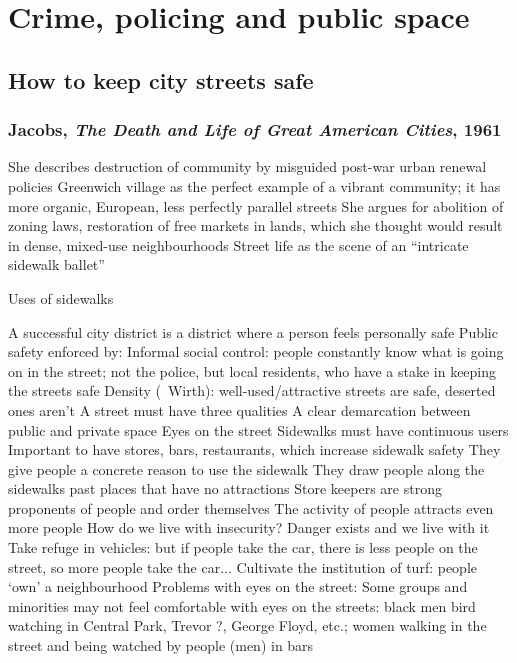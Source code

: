 \documentclass{article}
\begin{document}

\section{Crime, policing and public space}
\date{September 28th, 2021}

\subsection{How to keep city streets safe}

\subsubsection{Jacobs, \textit{The Death and Life of Great American Cities}, 1961}

\begin{outline}
	\1 She describes destruction of community by misguided post-war urban renewal policies
	\1 Greenwich village as the perfect example of a vibrant community; it has more organic, European, less perfectly parallel streets
	\1 She argues for abolition of zoning laws, restoration of free markets in lands, which she thought would result in dense, mixed-use neighbourhoods
	\1 Street life as the scene of an ``intricate sidewalk ballet''
\end{outline}

Uses of sidewalks
\begin{outline}
		\1 A successful city district is a district where a person feels personally safe
		\1 Public safety enforced by:
			\2 Informal social control: people constantly know what is going on in the street; not the police, but local residents, who have a stake in keeping the streets safe
			\2 Density (~Wirth): well-used/attractive streets are safe, deserted ones aren't
		\1 A street must have three qualities
			\2 A clear demarcation between public and private space
			\2 Eyes on the street
			\2 Sidewalks must have continuous users
		\1 Important to have stores, bars, restaurants, which increase sidewalk safety
			\2 They give people a concrete reason to use the sidewalk
			\2 They draw people along the sidewalks past places that have no attractions
			\2 Store keepers are strong proponents of people and order themselves
			\2 The activity of people attracts even more people
		\1 How do we live with insecurity?
			\2 Danger exists and we live with it
			\2 Take refuge in vehicles: but if people take the car, there is less people on the street, so more people take the car...
			\2 Cultivate the institution of turf: people `own' a neighbourhood
		\1 Problems with eyes on the street:
			\2 Some groups and minorities may not feel comfortable with eyes on the streets: black men bird watching in Central Park, Trevor ?, George Floyd, etc.; women walking in the street and being watched by people (men) in bars 
\end{outline}
\end{document}
